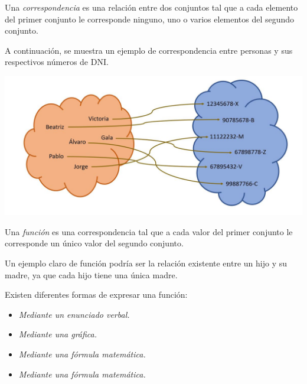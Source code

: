 
\begin{definition}
Una \emph{correspondencia} es una relación entre dos conjuntos tal que a cada elemento del primer conjunto le corresponde ninguno, uno o varios elementos del segundo conjunto.
\end{definition}

A continuación, se muestra un ejemplo de correspondencia entre personas y sus respectivos números de DNI.

\includegraphics{samples/imagenes/imagenConcepto.jpg}

\begin{definition}
Una \emph{función} es una correspondencia tal que a cada valor del primer conjunto le corresponde un único valor del segundo conjunto. 
\end{definition}
Un ejemplo claro de función podría ser la relación existente entre un hijo y su madre, ya que cada hijo tiene una única madre.

Existen diferentes formas de expresar una función:
\begin{itemize}
	\item \emph{Mediante un enunciado verbal.}
	\item \emph{Mediante una gráfica.}
	\item \emph{Mediante una fórmula matemática.}
	\item \emph{Mediante una fórmula matemática.}
\end{itemize}

